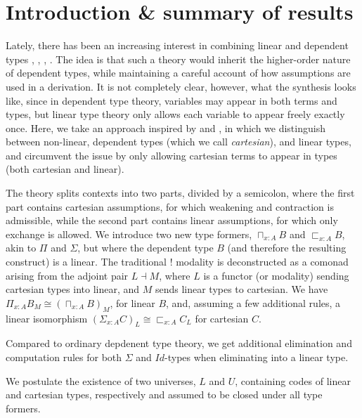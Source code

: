 \documentclass[a4paper,english]{lipics-v2018}
\begin{document}
\section{Introduction \& summary of results}
Lately, there has been an increasing interest in combining linear and dependent types  \cite{schreiber2014quantization}, \cite{krishnaswami}, \cite{vakar14}, \cite{nothing}. The idea is that such a theory would inherit the higher-order nature of dependent types, while maintaining a careful account of how assumptions are used in a derivation. It is not completely clear, however, what the synthesis looks like, since in dependent type theory, variables may appear in both terms and types, but linear type theory only allows each variable to appear freely exactly once. Here, we take an approach inspired by \cite{krishnaswami} and \cite{vakar14}, in which we distinguish between non-linear, dependent types (which we call \textit{cartesian}), and linear types, and circumvent the issue by only allowing cartesian terms to appear in types (both cartesian and linear).

The theory splits contexts into two parts, divided by a semicolon, where the first part contains cartesian assumptions, for which weakening and contraction is admissible, while the second part contains linear assumptions, for which only exchange is allowed. We introduce two new type formers, $\sqcap_{x : A}B$ and $\sqsubset_{x : A}B$, akin to $\Pi$ and $\Sigma$, but where the dependent type $B$ (and therefore the resulting construct) is a linear. The traditional $!$ modality is deconstructed as a comonad arising from the adjoint pair $L \dashv M$, where $L$ is a functor (or modality) sending cartesian types into linear, and $M$ sends linear types to cartesian. We have $\Pi_{x : A}B_M \cong (\sqcap_{x :A}B)_M$, for linear $B$, and, assuming a few additional rules, a linear isomorphism $(\Sigma_{x :A}C)_L \cong \sqsubset_{x :A}C_L$ for cartesian $C$.

Compared to ordinary depdenent type theory, we get additional elimination and computation rules for both $\Sigma$ and $Id$-types when eliminating into a linear type.

We postulate the existence of two universes, $L$ and $U$, containing codes of linear and cartesian types, respectively and assumed to be closed under all type formers.
\end{document}
